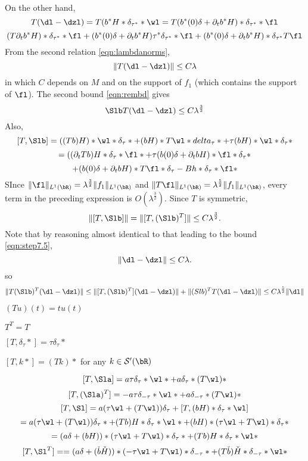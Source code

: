 On the other hand,
\[
  T(\dl - \dzl) = T(b^*H*\delta_{\tau^*}*\wl = T(b^*(0)\delta +
  \partial_t b^*H)*\delta_{\tau^*} *\fl
\]
\[
  (T\partial_tb^*H)*\delta_{\tau^*}*\fl+(b^*(0)\delta +
  \partial_t b^*H)\tau^*\delta_{\tau^*}*\fl +( b^*(0)\delta +
  \partial_t b^*H)*\delta_{\tau^*}T\fl
\]
From the second relation \ref{eqn:lambdanorms},
\begin{equation}
  \label{eqn:step7.5}
  \|T(\dl-\dzl)\| \le C \lambda
\end{equation}
in which $C$ depends on $M$ and on the support of $f_1$ (which
contains the support of $\fl$). The second bound \ref{eqn:rembd}
gives
\begin{equation}
  \label{step8}
  \Slb T(\dl-\dzl) \le C\lambda^{\frac{3}{2}}
\end{equation}
Also,
\[
  [T,\Slb] = ((Tb)H) *\wl * \delta_{\tau}* + (bH) * T\wl *
delta_{\tau} * + \tau (bH)* \wl * \delta_{\tau}*
\]
\[
  = ((\partial_t Tb) H * \delta_{\tau}*\fl* +  \tau(b(0)\delta + \partial_t bH)*\fl*\delta_{\tau}*
\]
\[
  +( b(0)\delta + \partial_t bH)*T\fl*\delta_{\tau} -
  Bh*\delta_{\tau}*\fl*
\]
SInce $\|\fl\|_{L^1(\bR)} =\lambda^{\frac{3}{2}} \|f_1\|_{L^1(\bR)}$ and
$\| T\fl\|_{L^1(\bR)} = \lambda^{\frac{5}{2}} \|f_1\|_{L^1(\bR)}$, every term in
the preceding expression is $O(\lambda^{\frac{3}{2}})$. Since $T$ is symmetric,
\begin{equation}
  \label{eqn:step9}
  \|[T,\Slb]\| = \|[T,(\Slb)^T]\| \le C\lambda^{\frac{3}{2}}.
\end{equation}
Note that by reasoning almost identical to that leading to the bound
\ref{eqn:step7.5},
\begin{equation}
  \label{eqn:step9.5}
  \|\dl-\dzl\| \le C\lambda.
\end{equation}
so
\begin{equation}
  \label{eqn:step10}
  \|T (\Slb)^T(\dl-\dzl)\| \le \|[ T, (\Slb)^T](\dl-\dzl)\| +
  \|(Slb)^TT (\dl-\dzl)\| \le C\lambda^{\frac{5}{2}}\|\dl\|
\end{equation}



$(Tu)(t) = tu(t)$

$T^T = T$

$[T,\delta_{\tau}*] = \tau \delta_{\tau}*$

$[T,k *] = (Tk)*$ for any $k \in {\cal S}'(\bR)$

\[
  [T,\Sla] = a \tau \delta_{\tau} * \wl* + a \delta_{\tau} * (T\wl)*
\]
\[
  [T,(\Sla)^T] = -a \tau \delta_{-\tau} * \wl* + a \delta_{-\tau}*(T\wl) *
\]
\[
  [T,\Sl] = a (\tau  \wl +  (T\wl) ) \delta_{\tau} + [T,(bH)*\delta_{\tau}*\wl]
\]
\[
  =a (\tau  \wl +  (T\wl) ) \delta_{\tau}* + (Tb)H *\delta_{\tau}*\wl* +
  (bH)*(\tau \wl + T\wl)*\delta_{\tau}*
\]
\[
  = (a\delta + (bH))*(\tau \wl +
  T\wl)*\delta_{\tau}* + (Tb)H *\delta_{\tau}*\wl*
\]
\[
[T,\Sl^T] =   = (a\delta + (\check{b}\check{H}))*(-\tau \wl +
  T\wl)*\delta_{-\tau}* + (T\check{b})\check{H} *\delta_{-\tau}*\wl*
\]

